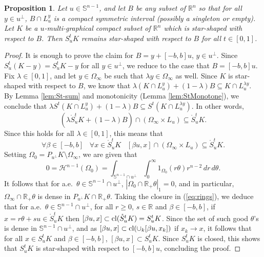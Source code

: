 \documentclass[11pt]{article}
\newtheorem{prop}[thm]{Proposition}
\theoremstyle{definition}
\theoremstyle{proof}
\DeclareMathOperator{\+}{\mathop{\tilde{+}}}
\DeclareMathOperator{\closure}{\textnormal{cl}}
\newcommand{\brac}[1]{\left(#1\right)}
\newcommand{\R}{\mathbb{R}}
\renewcommand{\S}{\mathbb{S}}
\renewcommand{\H}{\mathcal{H}}
\numberwithin{equation}{section}
\numberwithin{equation}{section}
\begin{document}
\begin{prop} \label{prop:Steiner-star-shaped}
Let $u \in \S^{n-1}$, and let $B$ be any subset of $\R^n$ so that for all $y \in u^{\perp}$, $B \cap L_u^y$ is a compact \emph{symmetric} interval (possibly a singleton or empty). Let $K$ be a $u$-multi-graphical compact subset of $\R^n$ which is star-shaped with respect to $B$. Then $S^t_u K$ remains star-shaped with respect to $B$ for all $t \in [0,1]$. 
\end{prop}
\begin{proof}
It is enough to prove the claim for $B = y + [-b,b] u$, $y \in u^{\perp}$. Since $S_u^t (K-y) = S_u^t K - y$ for all $y \in u^{\perp}$, we reduce to the case that $B = [-b,b] u$. Fix $\lambda \in [0,1]$, and let $y \in \Omega_\infty$ be such that $\lambda y \in \Omega_\infty$ as well. Since $K$ is star-shaped with respect to $B$, we know that $\lambda (K \cap L_u^y) + (1-\lambda) B \subseteq K \cap L_u^{\lambda y}$. By Lemma \ref{lem:St-sum} and monotonicity (Lemma \ref{lem:StMonotone}), we conclude that $\lambda S^t (K \cap L_u^y) + (1-\lambda) B \subseteq S^t (K \cap L_u^{\lambda y})$. In other words,
\[
\brac{\lambda \mathring S_u^t K + (1-\lambda) B} \cap (\Omega_\infty \times L_u) \subseteq \mathring S^t_u K . \]
Since this holds for all $\lambda \in [0,1]$, this means that
\begin{equation} \label{eq:rings}
\forall \beta \in [-b,b] \;\;\; \forall x \in \mathring S_u^t K \;\;\; [\beta u,x] \cap (\Omega_\infty \times L_u) \subseteq \mathring S^t_u K . 
\end{equation}
Setting $\Omega_0 = P_{u^{\perp}} K \setminus \Omega_\infty$, we are given that
\[
0 = \H^{n-1}(\Omega_0) = \int_{\S^{n-1} \cap u^{\perp}} \int_0^\infty 1_{\Omega_0}(r \theta) r^{n-2} \, dr \, d\theta .
\]
It follows that for a.e.~$\theta \in \S^{n-1} \cap u^{\perp}$, $|\Omega_0 \cap \R_+ \theta|_1 = 0$, and in particular, $\Omega_\infty \cap \R_+ \theta$ is dense in $P_{u^{\perp}} K \cap \R_+ \theta$. Taking the closure in (\ref{eq:rings}), we deduce that for a.e.~$\theta \in \S^{n-1} \cap u^{\perp}$, for all $r \geq 0$, $s \in \R$ and $\beta \in [-b,b]$, if $x = r \theta + s u \in \mathring S_u^t K$ then $[\beta u,x] \subset \closure(\mathring S^t_u K) = S^t_u K$. Since the set of such good $\theta$'s is dense in $\S^{n-1} \cap u^{\perp}$, and as $[\beta u,x] \subset \closure(\cup_k [\beta u,x_k])$ if $x_k \rightarrow x$, it follows that for all $x \in  S_u^t K$ and $\beta \in [-b,b]$, $[\beta u,x] \subset S^t_u K$. 
Since $S_u^t K$ is closed, this shows that $S_u^t K$ is star-shaped with respect to $[-b,b] u$, concluding the proof. \end{proof}
\end{document}
